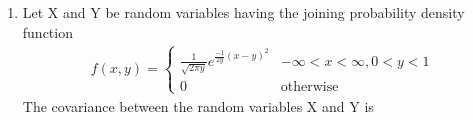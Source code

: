 \renewcommand{\theequation}{\theenumi}
\renewcommand{\thefigure}{\theenumi}
\renewcommand{\thetable}{\theenumi}
\begin{enumerate}[label=\thesection.\arabic*.,ref=\thesection.\theenumi]

\item Let X and Y be random variables having the joining probability density function
\begin{align}
f(x,y)=
\begin{cases}
\frac{1}{\sqrt{2\pi y}}e^{\frac{-1}{2y}(x-y)^2} &-\infty<x<\infty,0<y<1\\
0 &\text{otherwise}
\end{cases}
\end{align}
The covariance between the random variables X and Y is
\\
\solution



\end{enumerate}
